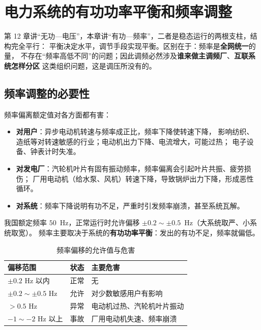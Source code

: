 
\chapter{电力系统的有功功率平衡和频率调整}

第 12 章讲“无功—电压”，本章讲“有功—频率”，二者是稳态运行的两根支柱，结构完全平行：
平衡决定水平，调节手段实现平衡。区别在于：频率是\textbf{全网统一}的量，
不存在“频率高低不同”的问题；因此调频必然涉及\textbf{谁来做主调频厂}、\textbf{互联系统怎样分区}
这类组织问题，这是调压所没有的。

\section{频率调整的必要性}

频率偏离额定值对各方面都有害：
\begin{itemize}
  \item \textbf{对用户}：异步电动机转速与频率成正比，频率下降使转速下降，
        影响纺织、造纸等对转速敏感的行业；电动机出力下降、电流增大，可能过热；
        电子设备、钟表计时失准。
  \item \textbf{对发电厂}：汽轮机叶片有固有振动频率，频率偏离会引起叶片共振、疲劳损伤；
        厂用电动机（给水泵、风机）转速下降，导致锅炉出力下降，形成恶性循环。
  \item \textbf{对系统}：频率下降说明有功不足，严重时引发频率崩溃，甚至系统瓦解。
\end{itemize}
我国额定频率 $50$~Hz，正常运行时允许偏移 $\pm0.2\sim\pm0.5$~Hz（大系统取严、小系统取宽）。
频率主要取决于系统的\textbf{有功功率平衡}：发出的有功不足，频率就偏低。

\begin{table}[htbp]
  \centering
  \caption{频率偏移的允许值与危害}
  \small
  \begin{tabular}{@{}lll@{}}
    \toprule
    偏移范围 & 状态 & 主要危害 \\
    \midrule
    $\pm0.2$ Hz 以内 & 正常 & 无 \\
    $\pm0.2\sim\pm0.5$ Hz & 允许 & 对少数敏感用户有影响 \\
    $>0.5$ Hz & 异常 & 电动机过热、汽轮机叶片振动 \\
    $-1\sim-2$ Hz 以上 & 事故 & 厂用电动机失速、频率崩溃 \\
    \bottomrule
  \end{tabular}
\end{table}

